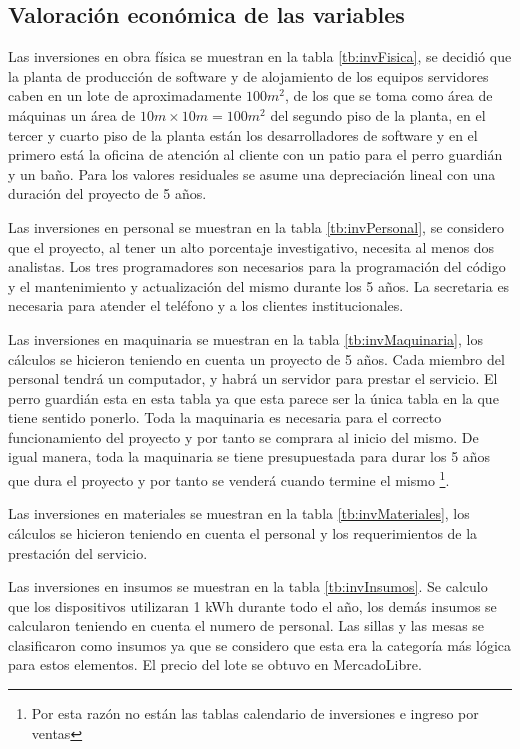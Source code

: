 \documentclass[a4paper, 12pt, oneside]{article}
\begin{document}
	\subsection{Valoración económica de las variables}
	Las inversiones en obra física se muestran en la tabla \ref{tb:invFisica}, se decidió que la planta de producción de software y de alojamiento de los equipos servidores caben en un lote de aproximadamente $100m^2$, de los que se toma como área de máquinas un área de $10m \times 10m = 100m^2$ del segundo piso de la planta, en el tercer y cuarto piso de la planta están los desarrolladores de software y en el primero está la oficina de atención al cliente con un patio para el perro guardián y un baño. Para los valores residuales se asume una depreciación lineal con una duración del proyecto de 5 años.

	Las inversiones en personal se muestran en la tabla \ref{tb:invPersonal}, se considero que el proyecto, al tener un alto porcentaje investigativo, necesita al menos dos analistas. Los tres programadores son necesarios para la programación del código y el mantenimiento y actualización del mismo durante los 5 años. La secretaria es necesaria para atender el teléfono y a los clientes institucionales.

	Las inversiones en maquinaria se muestran en la tabla \ref{tb:invMaquinaria}, los cálculos se hicieron teniendo en cuenta un proyecto de 5 años. Cada miembro del personal tendrá un computador, y habrá un servidor para prestar el servicio. El perro guardián esta en esta tabla ya que esta parece ser la única tabla en la que tiene sentido ponerlo. Toda la maquinaria es necesaria para el correcto funcionamiento del proyecto y por tanto se comprara al inicio del mismo. De igual manera, toda la maquinaria se tiene presupuestada para durar los 5 años que dura el proyecto y por tanto se venderá cuando termine el mismo \footnote{Por esta razón no están las tablas calendario de inversiones e ingreso por ventas}.
	
	Las inversiones en materiales se muestran en la tabla \ref{tb:invMateriales}, los cálculos se hicieron teniendo en cuenta el personal y los requerimientos de la prestación del servicio.

	Las inversiones en insumos se muestran en la tabla \ref{tb:invInsumos}. Se calculo que los dispositivos utilizaran 1 kWh durante todo el año, los demás insumos se calcularon teniendo en cuenta el numero de personal. Las sillas y las mesas se clasificaron como insumos ya que se considero que esta era la categoría más lógica para estos elementos. El precio del lote se obtuvo en MercadoLibre.
	
\end{document}
